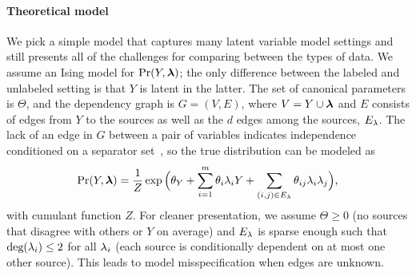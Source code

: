 
\paragraph{Theoretical model}
We pick a simple model that captures many latent variable model settings and still presents all of the challenges for comparing between the types of data. We assume an Ising model for $\Pr(Y, \bm{\lambda})$; the only difference between the labeled and unlabeled setting is that $Y$ is latent in the latter. %
The set of canonical parameters is $\Theta$, and the dependency graph is $G = (V, E)$, where $V = Y \cup \bm{\lambda}$ and $E$ consists of edges from $Y$ to the sources as well as the $d$ edges among the sources, $E_{\lambda}$. %
The lack of an edge in $G$ between a pair of
variables indicates independence conditioned on a separator set~\citep{Lauritzen}, so the true distribution can be modeled as
\begin{align}
    \Pr(Y, \bm{\lf}) = \frac{1}{Z} \exp \Big(\theta_Y + \sum_{i = 1}^m \theta_i \lf_i Y + \sum_{(i, j) \in E_{\lf}} \theta_{ij} \lf_i \lf_j \Big),
     \nonumber 
    \vspace{-0.5em}
\end{align}
with cumulant function $Z$. For cleaner presentation, we assume $\Theta \ge 0$ (no sources that disagree with others or $Y$ on average) and $E_{\lambda}$ is sparse enough such that $\text{deg}(\lambda_i) \le 2$ for all $\lambda_i$ (each source is conditionally dependent on at most one other source). This leads to model misspecification when edges are unknown.


